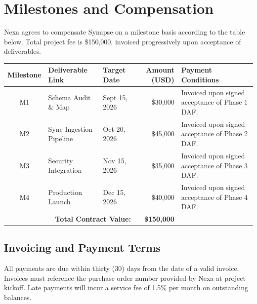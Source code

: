 \section{Milestones and Compensation}
Nexa agrees to compensate Synapse on a milestone basis according to the table below. Total project fee is \$150,000, invoiced progressively upon acceptance of deliverables.

\vspace{0.4cm}
\noindent
\begin{tabularx}{\textwidth}{@{} c l l r X @{}}
  \toprule
  \bfseries Milestone & \bfseries Deliverable Link & \bfseries Target Date & \bfseries Amount (USD) & \bfseries Payment Conditions \\
  \midrule
  M1 & Schema Audit \& Map & Sept 15, 2026 & \$30,000 & Invoiced upon signed acceptance of Phase 1 DAF. \\
  \rowcolor{lightbg} M2 & Sync Ingestion Pipeline & Oct 20, 2026 & \$45,000 & Invoiced upon signed acceptance of Phase 2 DAF. \\
  M3 & Security Integration & Nov 15, 2026 & \$35,000 & Invoiced upon signed acceptance of Phase 3 DAF. \\
  \rowcolor{lightbg} M4 & Production Launch & Dec 15, 2026 & \$40,000 & Invoiced upon signed acceptance of Phase 4 DAF. \\
  \midrule
  \multicolumn{3}{r}{\textbf{Total Contract Value:}} & \textbf{\$150,000} & \\
  \bottomrule
\end{tabularx}
\vspace{0.4cm}

\subsection{Invoicing and Payment Terms}
All payments are due within thirty (30) days from the date of a valid invoice. Invoices must reference the purchase order number provided by Nexa at project kickoff. Late payments will incur a service fee of 1.5\% per month on outstanding balances.
